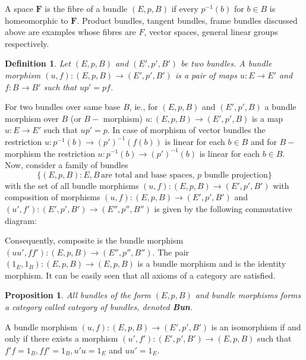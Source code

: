 \documentclass[10pt,a4paper]{amsart}
\newtheorem{prop}{Proposition}
\newtheorem{defn}{Definition}
\begin{document}
	A space $\textbf{F}$ is the fibre of a bundle  $(E, p, B)$ if every $p^{-1}(b)$ for $b \in B$ is homeomorphic to $\textbf{F}$.  
	Product bundles, tangent bundles, frame bundles discussed above are examples whose fibres are $F$, vector spaces, general linear groups respectively.

	\begin{defn}
		Let $(E, p, B)$ and $(E',p',B')$ be two bundles. A bundle morphism $(u,f) : (E, p, B) \rightarrow (E',p',B')$ is a pair of maps $u: E \rightarrow E'$ and $f: B \rightarrow B'$ such that $up' = pf$.
	\end{defn}
	For two bundles over same base $B$, ie., for  $(E, p, B)$ and $(E',p',B)$ a bundle morphism over $B$ (or $B-$ morphism) $u : (E, p, B) \rightarrow (E',p',B)$ is a map $u: E \rightarrow E'$ such that $up' = p$.	
	In case of morphism of vector bundles the restriction $u: p^{-1}(b) \rightarrow (p')^{-1}(f(b))$ is linear for each $b \in B$ and for $B-$ morphism the restriction $u: p^{-1}(b) \rightarrow (p')^{-1}(b)$ is linear for each $b \in B$.\\
	
	Now, consider a family of bundles $$\{(E, p, B) : E,B \,\text{are total and base spaces, $p$ bundle projection}\}$$
	with the set of all bundle morphisms $(u,f) : (E, p, B) \rightarrow (E',p',B')$ with composition of morphisms  $(u,f) : (E, p, B) \rightarrow (E',p',B')$ and $(u',f') : (E',p',B') \rightarrow (E'',p'',B'')$ 
	 is given by the following commutative diagram: 
	\begin{center}
	\end{center}
	Consequently, composite is the bundle morphism $(uu', ff'):  (E, p, B) \rightarrow (E'',p'',B'')$. The pair $(1_E,1_B):(E, p, B) \rightarrow (E, p, B)$ is a bundle morphism and is the identity morphism. It can be easily seen that all axioms of a category are satisfied.  
	 \begin{prop}
	 	All bundles of the form  $(E, p, B)$ and bundle morphisms forms a category called category of bundles, denoted \textbf{Bun}.
	 \end{prop}
 A bundle morphism $(u,f) : (E, p, B) \rightarrow (E',p',B')$  is an isomorphism if and only if there exists a morphism  $(u',f') : (E',p',B') \rightarrow (E, p, B)$ such that $f'f = 1_B, ff' = 1_B, u'u = 1_E$ and $uu' = 1_E$.
	
\end{document}
